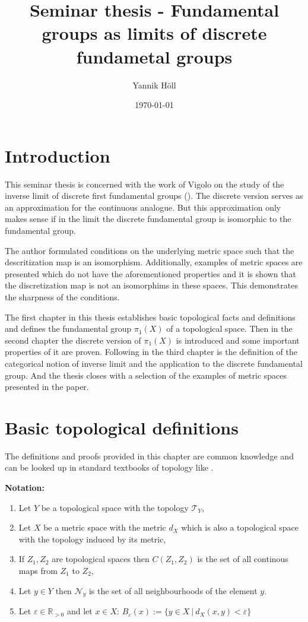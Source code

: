 \documentclass[a4paper, 11pt, twoside]{article}
\title{Seminar thesis - Fundamental groups as limits of discrete fundametal groups}
\author{Yannik Höll}
\date{\today}
\newcommand{\R}[0]{\mathbb{R}}
\newcommand{\T}[0]{\mathcal{T}}
\newcommand{\NB}[0]{\mathcal{N}}
\theoremstyle{break}
\theoremstyle{break}
\begin{document}
\nocite{*}

\maketitle

\section*{Introduction}
This seminar thesis is concerned with the work of Vigolo on the study of the inverse limit of discrete first fundamental groups (\cite{vigolo2018fundamental}). The discrete version serves as an approximation
for the continuous analogue. But this approximation only makes sense if in the limit the discrete fundamental group is isomorphic to the fundamental group.

The author formulated conditions on the underlying metric space such that the descritization map is an isomorphism. 
Additionally, examples of metric spaces are presented which do not have the aforementioned properties and it is shown that the discretization map is not an isomorphims
in these spaces. This demonstrates the sharpness of the conditions.

The first chapter in this thesis establishes basic topological facts and definitions and defines the fundamental group $\pi_1(X)$ of a topological space.
Then in the second chapter the discrete version of $\pi_1(X)$ is introduced and some important properties of it are proven.
Following in the third chapter is the definition of the categorical notion of inverse limit and the application to the discrete fundamental group. 
And the thesis closes with a selection of the examples of metric spaces presented in the paper. 

\section{Basic topological definitions} \label{section-basic-defs}

The definitions and proofs provided in this chapter are common knowledge and can be looked up in standard textbooks of topology like \cite{munkres2000topology}.

\textbf{Notation:}
\begin{enumerate}
  \item Let $Y$ be a topological space with the topology $\T_Y$,
  \item Let $X$ be a metric space with the metric $d_X$ which is also a topological space with the topology induced by its metric,
  \item If $Z_1, Z_2$ are topological spaces then $C(Z_1, Z_2)$ is the set of all continous maps from $Z_1$ to $Z_2$,
  \item Let $y \in Y$ then $\NB_y$ is the set of all neighbourhoods of the element $y$.
  \item Let $\varepsilon \in \R_{>0}$ and let $x \in X$: $B_{\varepsilon}(x) := \{ y\in X \: | \: d_X(x, y) < \varepsilon\}$
\end{enumerate}
\end{document}
